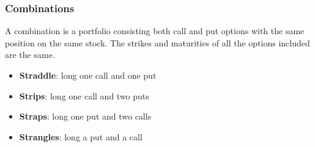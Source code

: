 \subsubsection{Combinations}
A combination is a portfolio consisting both call and put options with the same
position on the same stock. The strikes and maturities of all the options
included are the same.
\begin{itemize}
  \item \textbf{Straddle}: long one call and one put
  \item \textbf{Strips}: long one call and two puts
  \item \textbf{Straps}: long one put and two calls
  \item \textbf{Strangles}: long a put and a call
\end{itemize}
